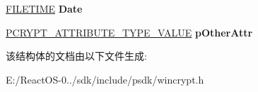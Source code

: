 \begin{DoxyCompactItemize}
\hyperlink{struct___f_i_l_e_t_i_m_e}{F\+I\+L\+E\+T\+I\+ME} {\bfseries Date}
\item 
\mbox{\label{struct___c_m_s_g___m_a_i_l___l_i_s_t___r_e_c_i_p_i_e_n_t___i_n_f_o_a2d45cfa2960a751c19dc173b1a434c23}} 
\hyperlink{struct___c_r_y_p_t___a_t_t_r_i_b_u_t_e___t_y_p_e___v_a_l_u_e}{P\+C\+R\+Y\+P\+T\+\_\+\+A\+T\+T\+R\+I\+B\+U\+T\+E\+\_\+\+T\+Y\+P\+E\+\_\+\+V\+A\+L\+UE} {\bfseries p\+Other\+Attr}
\end{DoxyCompactItemize}


该结构体的文档由以下文件生成\+:\begin{DoxyCompactItemize}
\item 
E\+:/\+React\+O\+S-\/0../sdk/include/psdk/wincrypt.\+h\end{DoxyCompactItemize}
